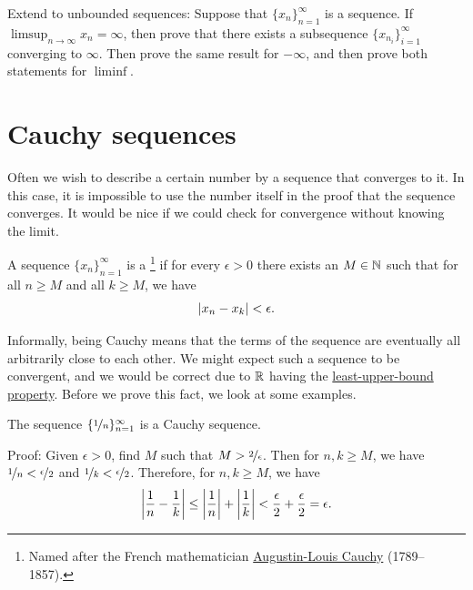 \begin{exercise} \label{exercise:extendsubseqlimsupinf}
Extend  to unbounded sequences:
Suppose that $\{ x_n \}_{n=1}^\infty$ is a sequence.
If $\limsup_{n\to\infty} x_n = \infty$, then prove that
there exists a subsequence $\{ x_{n_i} \}_{i=1}^\infty$ converging to $\infty$.
Then prove the same result for $-\infty$, and then prove both statements for
$\liminf$.
\end{exercise}



\sectionnewpage
\section{Cauchy sequences}
\label{sec:cauchy}


Often we wish to describe a certain number 
by a sequence that converges to it.  In this case, it is impossible to use the
number itself in the proof that the sequence converges.
It would be nice if we could check for convergence without knowing
the limit.

\begin{defn}
A sequence $\{ x_n \}_{n=1}^\infty$ is a \emph{}%
\footnote{%
Named after the French mathematician
\href{https://en.wikipedia.org/wiki/Cauchy}{Augustin-Louis Cauchy} (1789--1857).} if
for every $\epsilon > 0$ there exists an $M \in {\mathbb{N}}$ such that
for all $n \geq M$ and all $k \geq M$, we have
\begin{equation*}
\left\lvert {x_n - x_k} \right\rvert < \epsilon .
\end{equation*}
\end{defn}

Informally, being Cauchy means that the terms of the sequence are eventually
all arbitrarily close to each other.  We might expect such a sequence to be
convergent, and we would be correct due to ${\mathbb{R}}$ having the
\hyperref[defn:lub]{least-upper-bound property}.  Before we prove this fact,
we look at some examples.

\begin{example}
The sequence $\{ \nicefrac{1}{n} \}_{n=1}^\infty$ is a Cauchy sequence.

Proof:  Given $\epsilon > 0$, find $M$ such that
$M > \nicefrac{2}{\epsilon}$.  Then for $n,k \geq M$,
we have $\nicefrac{1}{n} < \nicefrac{\epsilon}{2}$
and
$\nicefrac{1}{k} < \nicefrac{\epsilon}{2}$.  Therefore, for $n, k \geq M$,
we have
\begin{equation*}
\left\lvert {\frac{1}{n} - \frac{1}{k}} \right\rvert
\leq
\left\lvert {\frac{1}{n}} \right\rvert + \left\lvert {\frac{1}{k}} \right\rvert
< \frac{\epsilon}{2} + \frac{\epsilon}{2} = \epsilon.
\end{equation*}
\end{example}

